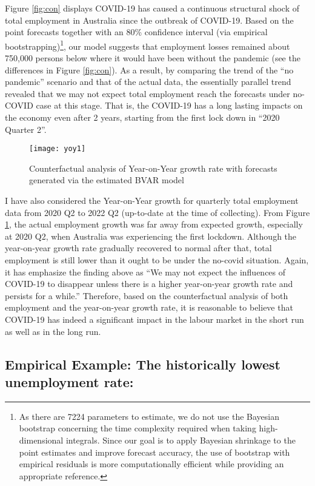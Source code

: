 \documentclass{monashthesis}
\begin{document}
Figure \ref{fig:con} displays COVID-19 has caused a continuous structural shock of total employment in Australia since the outbreak of COVID-19. Based on the point forecasts together with an 80\% confidence interval (via empirical bootstrapping)\footnote{As there are 7224 parameters to estimate, we do not use the Bayesian bootstrap concerning the time complexity required when taking high-dimensional integrals. Since our goal is to apply Bayesian shrinkage to the point estimates and improve forecast accuracy, the use of bootstrap with empirical residuals is more computationally efficient while providing an appropriate reference.}, our model suggests that employment losses remained about 750,000 persons below where it would have been without the pandemic (see the differences in Figure \ref{fig:con}). As a result, by comparing the trend of the ``no pandemic'' scenario and that of the actual data, the essentially parallel trend revealed that we may not expect total employment reach the forecasts under no-COVID case at this stage. That is, the COVID-19 has a long lasting impacts on the economy even after 2 years, starting from the first lock down in ``2020 Quarter 2''.

\begin{figure}[H]
\texttt{[image: yoy1]}
\centering
\caption{Counterfactual analysis of Year-on-Year growth rate with forecasts generated via the estimated BVAR model}
\label{fig:yoy}
\end{figure}

I have also considered the Year-on-Year growth for quarterly total employment data from 2020 Q2 to 2022 Q2 (up-to-date at the time of collecting). From Figure \ref{fig:yoy}, the actual employment growth was far away from expected growth, especially at 2020 Q2, when Australia was experiencing the first lockdown. Although the year-on-year growth rate gradually recovered to normal after that, total employment is still lower than it ought to be under the no-covid situation. Again, it has emphasize the finding above as ``We may not expect the influences of COVID-19 to disappear unless there is a higher year-on-year growth rate and persists for a while.'' Therefore, based on the counterfactual analysis of both employment and the year-on-year growth rate, it is reasonable to believe that COVID-19 has indeed a significant impact in the labour market in the short run as well as in the long run.

\hypertarget{empirical-example-the-historically-lowest-unemployment-rate}{%
\subsection{Empirical Example: The historically lowest unemployment rate:}\label{empirical-example-the-historically-lowest-unemployment-rate}}
\end{document}
